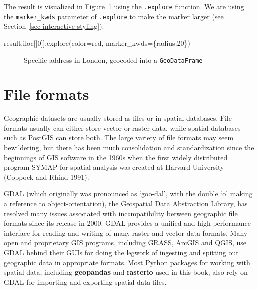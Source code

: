 \documentclass[
  letterpaper,
]{krantz}
\newenvironment{Shaded}{\begin{snugshade}}{\end{snugshade}}
\newcommand{\DecValTok}[1]{\textcolor[rgb]{0.68,0.00,0.00}{#1}}
\newcommand{\NormalTok}[1]{\textcolor[rgb]{0.00,0.23,0.31}{#1}}
\newcommand{\OperatorTok}[1]{\textcolor[rgb]{0.37,0.37,0.37}{#1}}
\newcommand{\StringTok}[1]{\textcolor[rgb]{0.13,0.47,0.30}{#1}}
\begin{document}
The result is visualized in Figure~\ref{fig-ox-geocode} using the
\texttt{.explore} function. We are using the \texttt{marker\_kwds}
parameter of \texttt{.explore} to make the marker larger (see
Section~\ref{sec-interactive-styling}).

\begin{Shaded}
\begin{Highlighting}[]
\NormalTok{result.iloc[[}\DecValTok{0}\NormalTok{]].explore(color}\OperatorTok{=}\StringTok{\textquotesingle{}red\textquotesingle{}}\NormalTok{, marker\_kwds}\OperatorTok{=}\NormalTok{\{}\StringTok{\textquotesingle{}radius\textquotesingle{}}\NormalTok{:}\DecValTok{20}\NormalTok{\})}
\end{Highlighting}
\end{Shaded}

\begin{figure}


\caption{\label{fig-ox-geocode}Specific address in London, geocoded into
a \texttt{GeoDataFrame}}

\end{figure}%

\section{File formats}\label{sec-file-formats}

Geographic datasets are usually stored as files or in spatial databases.
File formats usually can either store vector or raster data, while
spatial databases such as PostGIS can store both. The large variety of
file formats may seem bewildering, but there has been much consolidation
and standardization since the beginnings of GIS software in the 1960s
when the first widely distributed program SYMAP for spatial analysis was
created at Harvard University (Coppock and Rhind 1991).

GDAL (which originally was pronounced as `goo-dal', with the double `o'
making a reference to object-orientation), the Geospatial Data
Abstraction Library, has resolved many issues associated with
incompatibility between geographic file formats since its release in
2000. GDAL provides a unified and high-performance interface for reading
and writing of many raster and vector data formats. Many open and
proprietary GIS programs, including GRASS, ArcGIS and QGIS, use GDAL
behind their GUIs for doing the legwork of ingesting and spitting out
geographic data in appropriate formats. Most Python packages for working
with spatial data, including \textbf{geopandas} and \textbf{rasterio}
used in this book, also rely on GDAL for importing and exporting spatial
data files.
\end{document}
